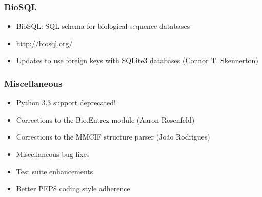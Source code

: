 \documentclass[trans]{beamer}
\begin{document}
\frame
{
  \frametitle{BioSQL}
  
  \begin{itemize}
  \item BioSQL: SQL schema for biological sequence databases
  \item \url{http://biosql.org/}
  \item Updates to use foreign keys with SQLite3 databases (Connor T. Skennerton)
  \end{itemize}
}

\frame
{
  \frametitle{Miscellaneous}

  \begin{itemize}
  \item Python 3.3 support deprecated!
  \item Corrections to the Bio.Entrez module (Aaron Rosenfeld)
  \item Corrections to the MMCIF structure parser (João Rodrigues)
  \item Miscellaneous bug fixes
  \item Test suite enhancements
  \item Better PEP8 coding style adherence
  \end{itemize}
}
\end{document}
